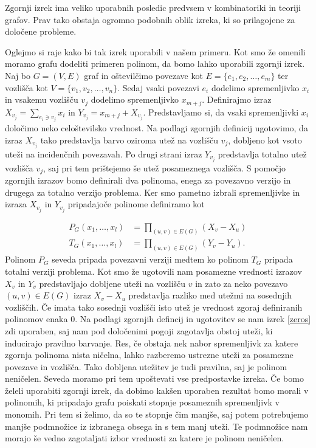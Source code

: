 \documentclass[12pt,a4paper,twoside]{article}
\theoremstyle{definition} %
\theoremstyle{plain} %
\numberwithin{equation}{section}  %
\begin{document}
Zgornji izrek ima veliko uporabnih posledic predvsem v kombinatoriki in teoriji grafov. Prav tako obstaja ogromno podobnih oblik izreka, ki so prilagojene za določene probleme.

Oglejmo si raje kako bi tak izrek uporabili v našem primeru. Kot smo že omenili moramo grafu dodeliti primeren polinom, da bomo lahko uporabili zgornji izrek. Naj bo $G = (V, E)$ graf in oštevilčimo povezave kot $E = \{e_1, e_2, \ldots, e_m \}$ ter vozlišča kot $V = \{v_1, v_2, \ldots, v_n\}$. Sedaj vsaki povezavi $e_i$ dodelimo spremenljivko $x_i$ in vsakemu vozlišču  $v_j$ dodelimo spremenljivko $x_{m + j}$. Definirajmo izraz $X_{v_j} = \sum_{e_i \ni v_j} x_i$ in $Y_{v_j} = x_{m+j} + X_{v_j}$. Predstavljamo si, da vsaki spremenljivki $x_i$ določimo neko celoštevilsko vrednost. Na podlagi zgornjih definicij ugotovimo, da izraz $X_{v_j}$ tako predstavlja barvo oziroma utež na vozlišču $v_j$, dobljeno kot vsoto uteži na incidenčnih povezavah. Po drugi strani izraz $Y_{v_j}$ predstavlja totalno utež vozlišča $v_j$, saj pri tem prištejemo še utež posameznega vozlišča. S pomočjo zgornjih izrazov bomo definirali dva polinoma, enega za povezavno verzijo in drugega za totalno verzijo problema. Ker smo pametno izbrali spremenljivke in izraza $X_{v_j}$ in $Y_{v_j}$ pripadajoče polinome definiramo kot

\begin{equation*}
\begin{split}
P_{G}(x_1, \ldots, x_l) &= \prod_{(u, v) \in E(G)} \left( X_v- X_u \right) \\
T_{G}(x_1, \ldots, x_l) &= \prod_{(u, v) \in E(G)} \left( Y_v- Y_u \right).
\end{split}
\end{equation*}
Polinom $P_G$ seveda pripada povezavni verziji medtem ko polinom $T_G$ pripada totalni verziji problema. Kot smo že ugotovili nam posamezne vrednosti izrazov $X_v$ in $Y_v$ predstavljajo dobljene uteži na vozlišču $v$ in zato za neko povezavo $(u,v) \in E(G)$ izraz $X_v - X_u$ predstavlja razliko med utežmi na sosednjih vozliščih. Če imata tako sosednji vozlišči isto utež je vrednost zgoraj definiranih polinomov enaka $0$. Na podlagi zgornjih defincij in ugotovitev se nam izrek \ref{zeros} zdi uporaben, saj nam pod določenimi pogoji zagotavlja obstoj uteži, ki inducirajo pravilno barvanje. Res, če obstaja nek nabor spremenljivk za katere zgornja polinoma nista ničelna, lahko razberemo ustrezne uteži za posamezne povezave in vozlišča. Tako dobljena utežitev je tudi pravilna, saj je polinom neničelen. Seveda moramo pri tem upoštevati vse predpostavke izreka. Če bomo želeli uporabiti zgornji izrek, da dobimo kakšen uporaben rezultat bomo morali v polinomih, ki pripadajo grafu poiskati stopnje posameznih spremenljivk v monomih. Pri tem si želimo, da so te stopnje čim manjše, saj potem potrebujemo manjše podmnožice iz izbranega obsega in s tem manj uteži. Te podmnožice nam morajo še vedno zagotaljati izbor vrednosti za katere je polinom neničelen.
\end{document}
